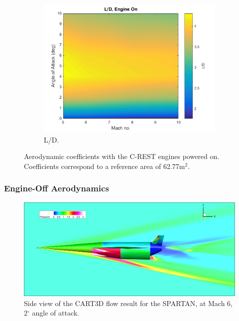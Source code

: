 \begin{figure}[ht]
\begin{subfigure}{.5\textwidth}
				\includegraphics[width=0.99\linewidth]{figures/3_vehicle_design/LD-EngineOn}
				\caption{L/D.}
				\label{fig:LD-EngineOn}
			\end{subfigure}
			\caption{Aerodynamic coefficients with the C-REST engines powered on. Coefficients correspond to a reference area of 62.77m$^2$. }
			\label{fig:EngineOnAero}
		\end{figure}
		
		

\subsubsection{Engine-Off Aerodynamics}


\begin{figure}[ht]
	\centering
	\includegraphics[width=0.9\linewidth]{figures/3_vehicle_design/CartSide}
	\caption{Side view of the CART3D flow result for the SPARTAN, at Mach 6, 2$^\circ$ angle of attack.}
	\label{fig:CartSide}
\end{figure}


